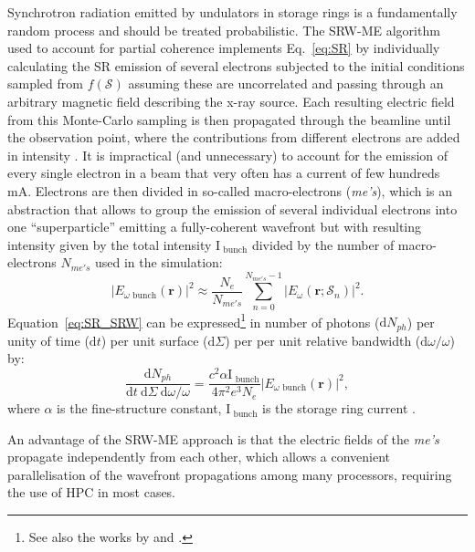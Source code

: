 \documentclass{iucr}              %
\begin{document}
Synchrotron radiation emitted by undulators in storage rings is a fundamentally random process and should be treated probabilistic. The SRW-ME algorithm used to account for partial coherence implements Eq.~\ref{eq:SR} by individually calculating the SR emission of several electrons subjected to the initial conditions sampled from $f(\mathcal{S})$ assuming these are uncorrelated and passing through an arbitrary magnetic field describing the x-ray source. Each resulting electric field from this Monte-Carlo sampling is then propagated through the beamline until the observation point, where the contributions from different electrons are added in intensity \cite{codeSRW_ME}. It is impractical (and unnecessary) to account for the emission of every single electron in a beam that very often has a current of few hundreds mA. Electrons are then divided in so-called macro-electrons (\textit{me's}), which is an abstraction that allows to group the emission of several individual electrons into one ``superparticle'' emitting a fully-coherent wavefront but with resulting intensity given by the total intensity $\text{I}_\text{~bunch}$ divided by the number of macro-electrons $N_{me's}$ used in the simulation:
\begin{equation}
|E_{\omega\text{~bunch}}(\textbf{r})|^2 \approx \frac{N_e}{N_{me's}}\sum_{n=0}^{N_{me's} - 1}\big| E_\omega(\textbf{r};\mathcal{S}_n)\big|^2.
\label{eq:SR_SRW}
\end{equation}
Equation~\ref{eq:SR_SRW} can be expressed\footnote{See also the works by  and .} in number of photons ($\text{d}N_{ph}$) per unity of time ($\text{d}t$) per unit surface ($\text{d}\Sigma$) per per unit relative bandwidth ($\text{d}\omega\big/\omega$) by:
\begin{equation}
\frac{\text{d}N_{ph}}{\text{d}t~\text{d}\Sigma~\text{d}\omega\big/\omega}=\frac{c^2\alpha \text{I}_\text{~bunch}}{4\pi^2e^3N_e}|E_{\omega\text{~bunch}}(\textbf{r})|^2,
\label{eq:SR_ph}
\end{equation}
where $\alpha$ is the fine-structure constant, $\text{I}_\text{~bunch}$ is the storage ring current \cite{Chubar1995}.

An advantage of the SRW-ME approach is that the electric fields of the \textit{me's} propagate independently from each other, which allows a convenient parallelisation of the wavefront propagations among many processors, requiring the use of HPC in most cases.
\end{document}
